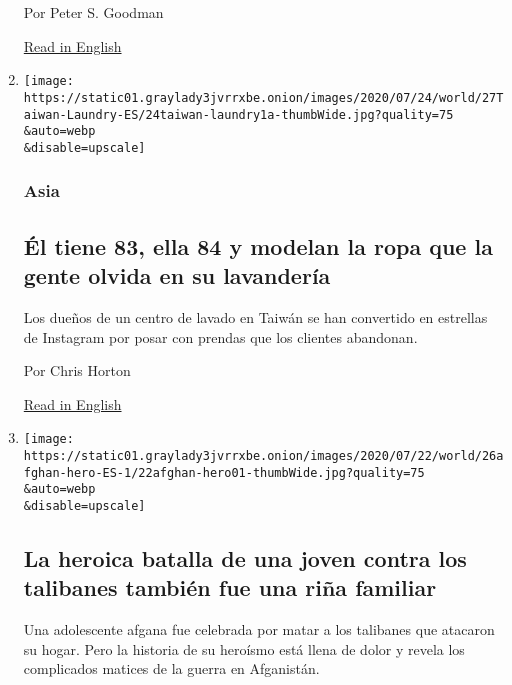 \begin{enumerate}
  Por Peter S. Goodman

  \href{https://www.nytimes3xbfgragh.onion/2020/07/27/business/global-remittances-coronavirus.html}{Read
  in English}
\item
  \href{/es/2020/07/28/espanol/mundo/lavanderia-taiwanesa-instagram.html}{}

  \texttt{[image: https://static01.graylady3jvrrxbe.onion/images/2020/07/24/world/27Taiwan-Laundry-ES/24taiwan-laundry1a-thumbWide.jpg?quality=75\\\&auto=webp\\\&disable=upscale]}

  \hypertarget{asia-1}{%
  \subsubsection{Asia}\label{asia-1}}

  \hypertarget{uxe9l-tiene-83-ella-84-y-modelan-la-ropa-que-la-gente-olvida-en-su-lavanderuxeda}{%
  \subsection{Él tiene 83, ella 84 y modelan la ropa que la gente olvida
  en su
  lavandería}\label{uxe9l-tiene-83-ella-84-y-modelan-la-ropa-que-la-gente-olvida-en-su-lavanderuxeda}}

  Los dueños de un centro de lavado en Taiwán se han convertido en
  estrellas de Instagram por posar con prendas que los clientes
  abandonan.

  Por Chris Horton

  \href{https://www.nytimes3xbfgragh.onion/2020/07/24/world/asia/taiwan-octogenarian-couple-instagram-laundry.html}{Read
  in English}
\item
  \href{/es/2020/07/26/espanol/mundo/guerra-afganistan-mujeres.html}{}

  \texttt{[image: https://static01.graylady3jvrrxbe.onion/images/2020/07/22/world/26afghan-hero-ES-1/22afghan-hero01-thumbWide.jpg?quality=75\\\&auto=webp\\\&disable=upscale]}

  \hypertarget{la-heroica-batalla-de-una-joven-contra-los-talibanes-tambiuxe9n-fue-una-riuxf1a-familiar}{%
  \subsection{La heroica batalla de una joven contra los talibanes
  también fue una riña
  familiar}\label{la-heroica-batalla-de-una-joven-contra-los-talibanes-tambiuxe9n-fue-una-riuxf1a-familiar}}

  Una adolescente afgana fue celebrada por matar a los talibanes que
  atacaron su hogar. Pero la historia de su heroísmo está llena de dolor
  y revela los complicados matices de la guerra en Afganistán.


\end{enumerate}

